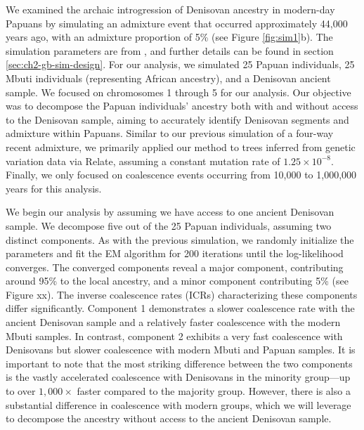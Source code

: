 We examined the archaic introgression of Denisovan ancestry in modern-day Papuans by simulating an admixture event that occurred approximately 44,000 years ago, with an admixture proportion of 5\% (see Figure \ref{fig:sim1}b). The simulation parameters are from \cite{skov2018detecting}, and further details can be found in section \ref{sec:ch2-gb-sim-design}. For our analysis, we simulated 25 Papuan individuals, 25 Mbuti individuals (representing African ancestry), and a Denisovan ancient sample. We focused on chromosomes 1 through 5 for our analysis. Our objective was to decompose the Papuan individuals' ancestry both with and without access to the Denisovan sample, aiming to accurately identify Denisovan segments and admixture within Papuans. Similar to our previous simulation of a four-way recent admixture, we primarily applied our method to trees inferred from genetic variation data via Relate, assuming a constant mutation rate of $1.25 \times 10^{-8}$. Finally, we only focused on coalescence events occurring from 10,000 to 1,000,000 years for this analysis.

We begin our analysis by assuming we have access to one ancient Denisovan sample. We decompose five out of the 25 Papuan individuals, assuming two distinct components. As with the previous simulation, we randomly initialize the parameters and fit the EM algorithm for 200 iterations until the log-likelihood converges. The converged components reveal a major component, contributing around 95\% to the local ancestry, and a minor component contributing 5\% (see Figure xx). The inverse coalescence rates (ICRs) characterizing these components differ significantly. Component 1 demonstrates a slower coalescence rate with the ancient Denisovan sample and a relatively faster coalescence with the modern Mbuti samples. In contrast, component 2 exhibits a very fast coalescence with Denisovans but slower coalescence with modern Mbuti and Papuan samples. It is important to note that the most striking difference between the two components is the vastly accelerated coalescence with Denisovans in the minority group—up to over $1{,}000 \times$ faster compared to the majority group. However, there is also a substantial difference in coalescence with modern groups, which we will leverage to decompose the ancestry without access to the ancient Denisovan sample.


